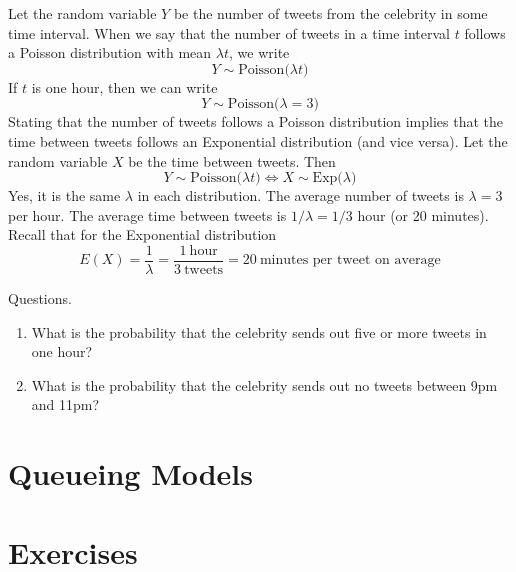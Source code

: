 Let the random variable $Y$ be the number of tweets from
the celebrity in some time interval.
When we say that the number of tweets in a time interval $t$ follows
a Poisson distribution with mean $\lambda t$, we write
\[
  Y \sim \text{Poisson($\lambda t$)}
\]
If $t$ is one hour, then we can write
\[
  Y \sim \text{Poisson($\lambda = 3$)}
\]
Stating that the number of tweets follows a Poisson distribution
implies that the time between tweets follows an Exponential
distribution (and vice versa). Let the random variable $X$ be
the time between tweets. Then
\[
  Y \sim \text{Poisson($\lambda t$)} \Longleftrightarrow X \sim \text{Exp($\lambda$)}
\]
Yes, it is the same $\lambda$ in each distribution.
The average number of tweets is $\lambda=3$ per hour. The average
time between tweets is $1/\lambda = 1/3$ hour (or 20 minutes).
Recall that for the Exponential distribution
\[
  E(X) = \frac{1}{\lambda} = \frac{1~\text{hour}}{3~\text{tweets}} = 20 ~\text{minutes per tweet on average}
\]

Questions.
\begin{enumerate}
\item What is the probability that the celebrity sends out five or
  more tweets in one hour?
\item What is the probability that the celebrity sends out
  no tweets between 9pm and 11pm?
\end{enumerate}

\section{Queueing Models}

\section{Exercises}

